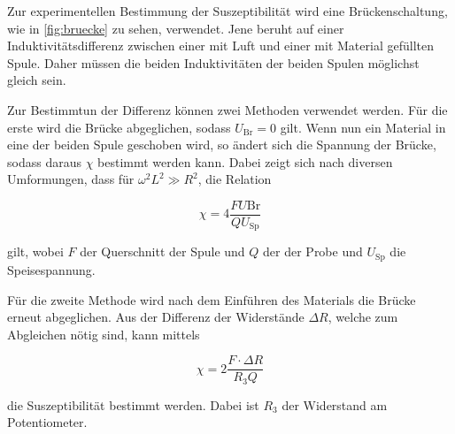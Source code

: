 Zur experimentellen Bestimmung der Suszeptibilität wird eine Brückenschaltung, wie in \autoref{fig:bruecke} zu sehen, verwendet.
Jene beruht auf einer Induktivitätsdifferenz zwischen einer mit Luft und einer mit Material gefüllten Spule.
Daher müssen die beiden Induktivitäten der beiden Spulen möglichst gleich sein.

Zur Bestimmtun der Differenz können zwei Methoden verwendet werden.
Für die erste wird die Brücke abgeglichen, sodass $U_\text{Br} = 0$ gilt.
Wenn nun ein Material in eine der beiden Spule geschoben wird, so ändert sich die Spannung der Brücke, sodass daraus $\chi$ bestimmt werden kann.
Dabei zeigt sich nach diversen Umformungen, dass für $\omega^2 L^2 \gg R^2$, die Relation

\begin{equation}
    \label{eqn:suszep-spannung}
    \chi = 4 \frac{F U\text{Br}}{Q U_\text{Sp}}
\end{equation}

gilt, wobei $F$ der Querschnitt der Spule und $Q$ der der Probe und $U_\text{Sp}$ die Speisespannung.

Für die zweite Methode wird nach dem Einführen des Materials die Brücke erneut abgeglichen.
Aus der Differenz der Widerstände $\Delta R$, welche zum Abgleichen nötig sind, kann mittels

\begin{equation}
    \label{eqn:suszep-wider}
    \chi = 2 \frac{F \cdot \Delta R}{R_3 Q}
\end{equation}

die Suszeptibilität bestimmt werden. Dabei ist $R_3$ der Widerstand am Potentiometer.